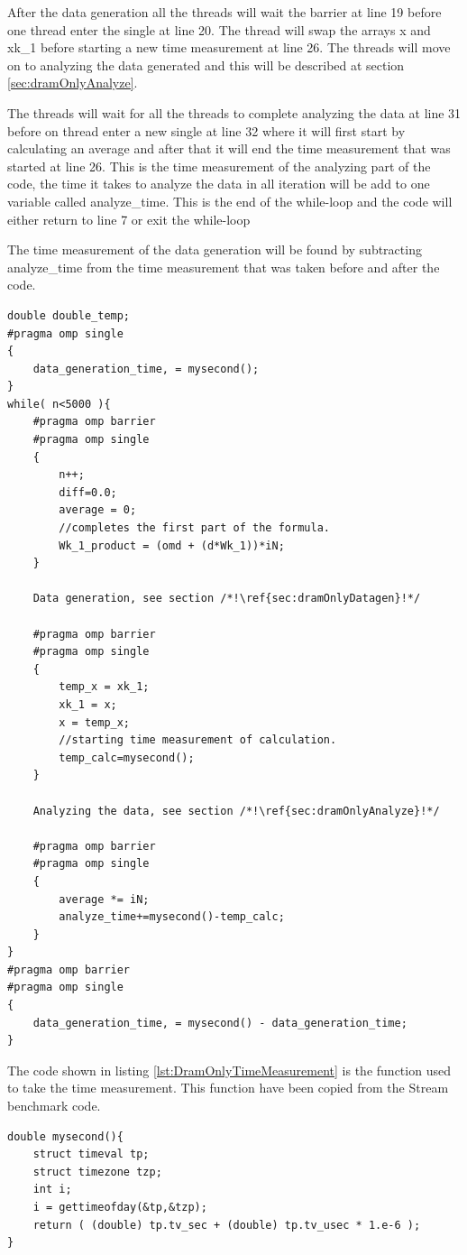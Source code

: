 \documentclass[12pt,a4paper,USenglish]{article}      %
\begin{document}
After the data generation all the threads will wait the barrier at line 19 before one thread enter the single at line 20. The thread will swap the arrays x and xk\_1 before starting a new time measurement at line 26.
The threads will move on to analyzing the data generated and this will be described at section \ref{sec:dramOnlyAnalyze}.

The threads will wait for all the threads to complete analyzing the data at line 31 before on thread enter a new single at line 32 where it will first start by calculating an average and after that it will end the time measurement that was started at line 26. This is the time measurement of the analyzing part of the code, the time it takes to analyze the data in all iteration will be add to one variable called analyze\_time. This is the end of the while-loop and the code will either return to line 7 or exit the while-loop

The time measurement of the data generation will be found by subtracting analyze\_time from the time measurement that was taken before and after the code. 

\begin{lstlisting}[caption={DRAM only version of the simulation code.},escapeinside={{/*!}{!*/}}, label={lst:DramOnlyMain}]
double double_temp;
#pragma omp single
{
	data_generation_time, = mysecond();
}
while( n<5000 ){
	#pragma omp barrier
	#pragma omp single
	{
		n++;
		diff=0.0;
		average = 0;
		//completes the first part of the formula.
		Wk_1_product = (omd + (d*Wk_1))*iN;
	}
	
	Data generation, see section /*!\ref{sec:dramOnlyDatagen}!*/
	
	#pragma omp barrier
	#pragma omp single
	{
		temp_x = xk_1;
		xk_1 = x;
		x = temp_x;
		//starting time measurement of calculation.
		temp_calc=mysecond();
	}
	
	Analyzing the data, see section /*!\ref{sec:dramOnlyAnalyze}!*/
	
	#pragma omp barrier
	#pragma omp single
	{
		average *= iN;
		analyze_time+=mysecond()-temp_calc;
	}
}
#pragma omp barrier
#pragma omp single
{
	data_generation_time, = mysecond() - data_generation_time;
}
\end{lstlisting}
The code shown in listing \ref{lst:DramOnlyTimeMeasurement} is the function used to take the time measurement. This function have been copied from the Stream benchmark code. 
\begin{lstlisting}[caption={Function that that is used for measure time},escapeinside={{/*!}{!*/}}, label={lst:DramOnlyTimeMeasurement}]
double mysecond(){
	struct timeval tp;
	struct timezone tzp;
	int i;
	i = gettimeofday(&tp,&tzp);
	return ( (double) tp.tv_sec + (double) tp.tv_usec * 1.e-6 );
}
\end{lstlisting}
\end{document}
